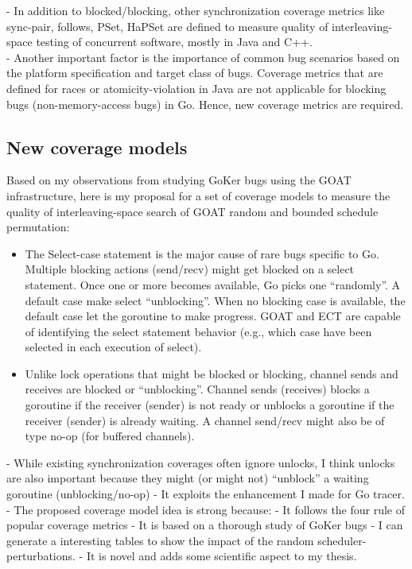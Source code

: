 -	In addition to blocked/blocking, other synchronization coverage metrics like sync-pair, follows, PSet, HaPSet are defined to measure quality of interleaving-space testing of concurrent software, mostly in Java and C++.
\\
-	Another important factor is the importance of common bug scenarios based on the platform specification and target class of bugs. Coverage metrics that are defined for races or atomicity-violation in Java are not applicable for blocking bugs (non-memory-access bugs) in Go. Hence, new coverage metrics are required.

\subsection{New coverage models}
Based on my observations from studying GoKer bugs using the GOAT infrastructure, here is my proposal for a set of coverage models to measure the quality of interleaving-space search of GOAT random and bounded schedule permutation:
\begin{itemize}
  \item The Select-case statement is the major cause of rare bugs specific to Go. Multiple blocking actions (send/recv) might get blocked on a select statement. Once one or more becomes available, Go picks one “randomly”. A default case make select “unblocking”. When no blocking case is available, the default case let the goroutine to make progress. GOAT and ECT are capable of identifying the select statement behavior (e.g., which case have been selected in each execution of select).
  \item Unlike lock operations that might be blocked  or blocking, channel sends and receives are blocked or “unblocking”. Channel sends (receives) blocks a goroutine if the receiver (sender) is not ready or unblocks a goroutine if the receiver (sender) is already waiting. A channel send/recv might also be of type no-op (for buffered channels).

\end{itemize}

-	While existing synchronization coverages often ignore unlocks, I think unlocks are also important because they might (or might not) “unblock” a waiting goroutine (unblocking/no-op)
- It exploits the enhancement I made for Go tracer.
- The proposed coverage model idea is strong because:
- It follows the four rule of popular coverage metrics
- It is based on a thorough study of GoKer bugs
- I can generate a interesting tables to show the impact of the random scheduler-perturbations.
- It is novel and adds some scientific aspect to my thesis.

